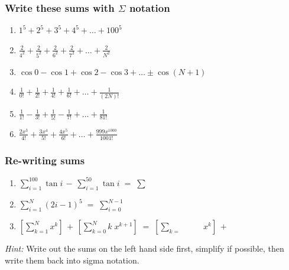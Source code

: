 \begin{frame}[t]
	\fontsize{13}{13}\selectfont
	\frametitle{Write these sums with $\Sigma$ notation}

	\begin{enumerate}
		\item $\displaystyle 1^{5}+ 2^{5}+ 3^{5}+ 4^{5}+ \ldots + 100^{5}$
			\vfill

		\item $\displaystyle \frac{2}{4^{2}}+ \frac{2}{5^{2}}+ \frac{2}{6^{2}}+ \frac{2}{7^{2}}
			+ \ldots + \frac{2}{N^{2}}$
			\vfill

		\item $\displaystyle \cos 0 - \cos 1 + \cos 2 - \cos 3 + %
			\ldots \pm \cos (N+1)$
			\vfill

		\item $\displaystyle \frac{1}{0!}+ \frac{1}{2!}+ \frac{1}{4!}+ \frac{1}{6!}+
			\ldots + \frac{1}{(2N)!}$
			\vfill

		\item $\displaystyle \frac{1}{1!}- \frac{1}{3!}+ \frac{1}{5!}- \frac{1}{7!}+
			\ldots + \frac{1}{81!}$
			\vfill

		\item $\displaystyle \frac{2x^{3}}{ 4!}+ \frac{3x^{4}}{5!}+ \frac{4x^{5}}{6!}
			+ \ldots + \frac{999x^{1000}}{1001!}$
	\end{enumerate}
\end{frame}

\begin{frame}[t]
	\fontsize{13}{13}\selectfont
	\frametitle{Re-writing sums}

	\begin{enumerate}
		\item $\displaystyle \sum_{i=1}^{100}\tan i \, - \, \sum_{i=1}^{50}\tan i \;
			= \; \sum_{\boxed{\phantom{???}}}^{\boxed{\phantom{???}}}\boxed{\phantom{?????^f_p}}$
			\vfill

		\item $\displaystyle \sum_{i=1}^{N}(2i-1)^{5}\; = \; \sum_{i=0}^{N-1}\boxed{\phantom{?????^f_p}}$
			\vfill

		\item $\displaystyle \left[ \sum_{k=1}^{N}x^{k}\right] \, + \, \left[ \sum_{k=0}
			^{N}k \; x^{k+1}\right] \; = \; \left[ \sum_{k=\boxed{\phantom{???}}}^{\boxed{\phantom{???}}}
			\!\!\boxed{\phantom{???}}\,x^{k}\right] \, + \, \boxed{\phantom{???}}$
			\vfill
	\end{enumerate}

	\emph{Hint:} Write out the sums on the left hand side first, simplify if
	possible, then write them back into sigma notation.
\end{frame}

